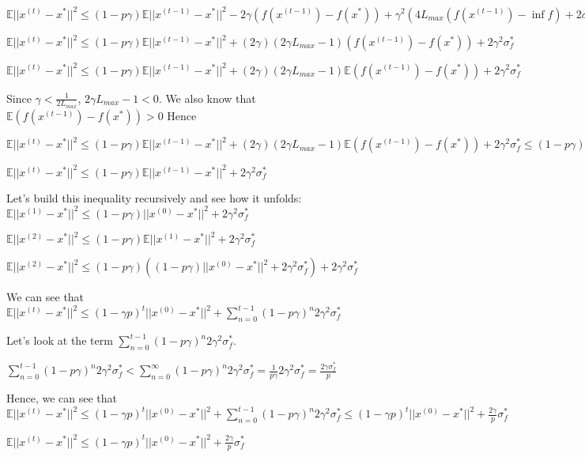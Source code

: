 $\mathbb{E}||x^{(t)} - x^*||^2  \leq (1 - p \gamma) \mathbb{E}||x^{(t - 1)} - x^*||^2 - 2\gamma(f(x^{(t - 1)}) - f(x^*)) + \gamma^2 (4L_{max} (f(x^{(t - 1)}) - \inf f) + 2 \sigma_f^*)$ \newline 

$\mathbb{E}||x^{(t)} - x^*||^2  \leq (1 - p \gamma) \mathbb{E}||x^{(t - 1)} - x^*||^2 + (2 \gamma) (2 \gamma L_{max} - 1)(f(x^{(t - 1)}) - f(x^*)) + 2\gamma^2 \sigma_f^*$ \newline 

$\mathbb{E}||x^{(t)} - x^*||^2  \leq (1 - p \gamma) \mathbb{E}||x^{(t - 1)} - x^*||^2 + (2 \gamma) (2 \gamma L_{max} - 1) \mathbb{E}(f(x^{(t - 1)}) - f(x^*)) + 2\gamma^2 \sigma_f^*$ \newline 

Since $\gamma < \frac{1}{2L_{max}}$, $2\gamma L_{max} - 1 < 0$. We also know that $\mathbb{E}(f(x^{(t - 1)}) - f(x^*)) > 0$ Hence \newline 

$\mathbb{E}||x^{(t)} - x^*||^2  \leq (1 - p \gamma) \mathbb{E}||x^{(t - 1)} - x^*||^2 + (2 \gamma) (2 \gamma L_{max} - 1) \mathbb{E}(f(x^{(t - 1)}) - f(x^*)) + 2\gamma^2 \sigma_f^* \leq (1 - p \gamma) \mathbb{E}||x^{(t - 1)} - x^*||^2 + 2\gamma^2 \sigma_f^*$ \newline 


$\mathbb{E}||x^{(t)} - x^*||^2  \leq (1 - p \gamma) \mathbb{E}||x^{(t - 1)} - x^*||^2 + 2\gamma^2 \sigma_f^*$ \newline 

Let's build this inequality recursively and see how it unfolds: \newline 
$\mathbb{E}||x^{(1)} - x^*||^2  \leq (1 - p \gamma) ||x^{(0)} - x^*||^2 + 2\gamma^2 \sigma_f^*$ \newline 

$\mathbb{E}||x^{(2)} - x^*||^2  \leq (1 - p \gamma) \mathbb{E}||x^{(1)} - x^*||^2 + 2\gamma^2 \sigma_f^*$ \newline 

$\mathbb{E}||x^{(2)} - x^*||^2  \leq (1 - p \gamma) ((1 - p \gamma) ||x^{(0)} - x^*||^2 + 2\gamma^2 \sigma_f^*) + 2\gamma^2 \sigma_f^*$ \newline 


We can see that $\mathbb{E}||x^{(t)} - x^*||^2 \leq (1 - \gamma p)^t ||x^{(0)} - x^*||^2 + \sum_{n=0}^{t - 1} (1 - p\gamma)^n 2\gamma^2 \sigma_f^*$

Let's look at the term $\sum_{n=0}^{t - 1} (1 - p\gamma)^n 2\gamma^2 \sigma_f^*$. 

$\sum_{n=0}^{t - 1} (1 - p\gamma)^n 2\gamma^2 \sigma_f^* < \sum_{n=0}^{\infty} (1 - p\gamma)^n 2\gamma^2 \sigma_f^* = \frac{1}{p\gamma} 2\gamma^2 \sigma_f^* = \frac{2\gamma \sigma_f^*}{p}$

Hence, we can see that \newline 
$\mathbb{E}||x^{(t)} - x^*||^2 \leq (1 - \gamma p)^t ||x^{(0)} - x^*||^2 + \sum_{n=0}^{t - 1} (1 - p\gamma)^n 2\gamma^2 \sigma_f^* \leq (1 - \gamma p)^t ||x^{(0)} - x^*||^2 + \frac{2 \gamma}{p} \sigma_f^*$

$\mathbb{E}||x^{(t)} - x^*||^2 \leq (1 - \gamma p)^t ||x^{(0)} - x^*||^2 + \frac{2 \gamma}{p} \sigma_f^*$
